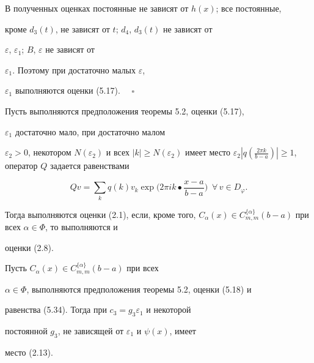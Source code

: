 В полученных оценках постоянные не зависят от $h(x)$; все постоянные, 


кроме $d_3(t)$, не зависят от $t$; $d_4$, $d_3(t)$ не зависят от 


$\varepsilon$, $\varepsilon_1$; $B$, $\varepsilon$ не зависят от 


$\varepsilon_1$. Поэтому при достаточно малых $\varepsilon$, 


$\varepsilon_1$ выполняются оценки (5.17). $\quad\square$ 


 


\begin{cors} 


Пусть выполняются предположения теоремы 5.2, оценки (5.17), 


$\varepsilon_1$ достаточно мало, при достаточно малом 


$\varepsilon_2>0$, некотором $N(\varepsilon_2)$ и всех $|k|\ge 


N(\varepsilon_2)$ имеет место $\varepsilon_2|q(\frac{2\pi k}{b-a})|\ge 


1$, оператор $Q$ задается равенствами 


\begin{equation} 


Q v=\sum_k q(k)v_k\exp\bigg(2\pi ik\bullet\frac{x-a}{b-a}\bigg) 


\ \; \forall\,v\in D_\varphi. 


\end{equation} 


Тогда выполняются оценки (2.1), если, кроме того, $C_\alpha(x)\in 


C^{\{\alpha\}}_{m,m}(b-a)$ при всех $\alpha\in\Phi$, то выполняются и 


оценки (2.8). 


\end{cors} 


 


\begin{cors} 


Пусть $C_\alpha(x)\in C^{\{\alpha\}}_{m,m}(b-a)$ при всех 


$\alpha\in\Phi$, выполняются предположения теоремы 5.2, оценки (5.18) и 


равенства (5.34). Тогда при $c_3=g_3\varepsilon_1$ и некоторой 


постоянной $g_3$, не зависящей от $\varepsilon_1$ и $\psi(x)$, имеет 


место (2.13). 


\end{cors} 


